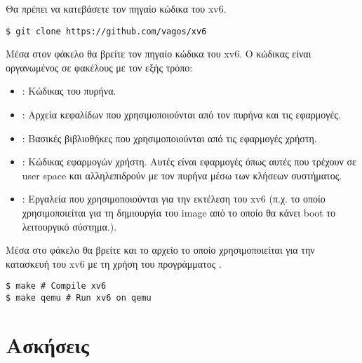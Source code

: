 \documentclass[18pt]{extarticle}
\begin{document}
Θα πρέπει να κατεβάσετε τον πηγαίο κώδικα του xv6.

\begin{commandline}
\begin{verbatim}
$ git clone https://github.com/vagos/xv6
\end{verbatim}
\end{commandline}

Μέσα στον φάκελο  θα βρείτε τον πηγαίο κώδικα του xv6.
Ο κώδικας είναι οργανωμένος σε φακέλους με τον εξής τρόπο: 

\begin{itemize}[label={--}]
    \item {}: Κώδικας του πυρήνα.
    \item {}: Αρχεία κεφαλίδων που χρησιμοποιούνται από τον πυρήνα και τις εφαρμογές.
    \item {}: Βασικές βιβλιοθήκες που χρησιμοποιούνται από τις εφαρμογές χρήστη.
    \item {}: Κώδικας εφαρμογών χρήστη. Αυτές είναι εφαρμογές όπως αυτές που τρέχουν σε user space και αλληλεπιδρούν με τον πυρήνα μέσω των κλήσεων συστήματος.
    \item {}: Εργαλεία που χρησιμοποιούνται για την εκτέλεση του xv6 (π.χ.  το οποίο χρησιμοποιείται για τη δημιουργία του image από το οποίο θα κάνει boot το λειτουργικό σύστημα.).
\end{itemize}

Μέσα στο φάκελο  θα βρείτε και το αρχείο  το οποίο χρησιμοποιείται για την κατασκευή του xv6 με τη χρήση του προγράμματος .

\begin{commandline}
\begin{verbatim}
$ make # Compile xv6
$ make qemu # Run xv6 on qemu
\end{verbatim}
\end{commandline}

\section{Ασκήσεις}
\end{document}
